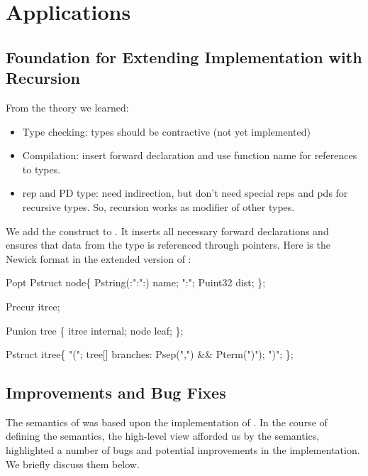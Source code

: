 \section{Applications}
\subsection{Foundation for Extending Implementation with Recursion}

From the theory we learned:
\begin{itemize}
\item Type checking: types should be contractive (not yet implemented)
\item Compilation: insert forward declaration and use function name for
  references to types.
\item rep and PD type: need indirection, but don't need special reps
  and pds for recursive types. So, recursion works as modifier of
  other types.
\end{itemize}

We add the construct  to \pads{}. It inserts all
necessary forward declarations and ensures that data from the type is
referenced through pointers. Here is the Newick format in the extended
version of \pads{}:

\begin{code}
Popt Pstruct node\{
  Pstring(:":":) name; ":";
  Puint32 dist;
\};\linebreak

Precur itree;\linebreak

Punion tree \{
  itree internal;
  node leaf;
\};\linebreak

Pstruct itree\{
  "(";
  tree[] branches: Psep(",") && Pterm(")");
  ")";
\};
\end{code}

\subsection{Improvements and Bug Fixes}

The semantics of \ddc{} was based upon the implementation of \pads{}.
In the course of defining the semantics, the high-level view afforded
us by the semantics, highlighted a number of bugs and potential
improvements in the \pads{} implementation. We briefly discuss them
below.


